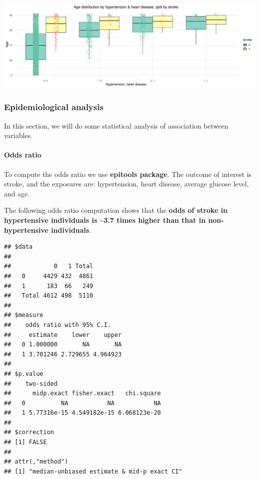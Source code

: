 \documentclass[
]{article}
\newenvironment{Shaded}{\begin{snugshade}}{\end{snugshade}}
\newcommand{\FunctionTok}[1]{\textcolor[rgb]{0.13,0.29,0.53}{\textbf{#1}}}
\newcommand{\NormalTok}[1]{#1}
\newcommand{\OtherTok}[1]{\textcolor[rgb]{0.56,0.35,0.01}{#1}}
\newcommand{\SpecialCharTok}[1]{\textcolor[rgb]{0.81,0.36,0.00}{\textbf{#1}}}
\begin{document}
\includegraphics{Build-deploy-stroke-prediction-model-R_files/figure-latex/pairwise_age_heartd_hypert-1.pdf}

\subsubsection{\texorpdfstring{\textbf{Epidemiological
analysis}}{Epidemiological analysis}}\label{epidemiological-analysis}

In this section, we will do some statistical analysis of association
between variables.

\paragraph{\texorpdfstring{\textbf{Odds
ratio}}{Odds ratio}}\label{odds-ratio}

To compute the odds ratio we use \textbf{epitools package}. The outcome
of interest is stroke, and the exposures are: hypertension, heart
disease, average glucose level, and age.

The following odds ratio computation shows that the \textbf{odds of
stroke in hypertensive individuals is \textasciitilde3.7 times higher
than that in non-hypertensive individuals}.

\begin{Shaded}
\end{Shaded}

\begin{verbatim}
## $data
##        
##            0   1 Total
##   0     4429 432  4861
##   1      183  66   249
##   Total 4612 498  5110
## 
## $measure
##    odds ratio with 95% C.I.
##     estimate    lower    upper
##   0 1.000000       NA       NA
##   1 3.701246 2.729655 4.964923
## 
## $p.value
##    two-sided
##      midp.exact fisher.exact   chi.square
##   0          NA           NA           NA
##   1 5.77316e-15 4.549182e-15 6.068123e-20
## 
## $correction
## [1] FALSE
## 
## attr(,"method")
## [1] "median-unbiased estimate & mid-p exact CI"
\end{verbatim}
\end{document}
